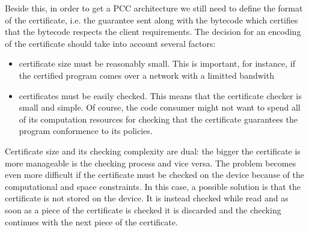 Beside this, in order to get a PCC architecture we still need to define the
format of the certificate, i.e. 
the guarantee sent along with the bytecode which certifies that the bytecode 
respects the client requirements. The decision for an encoding of the
certificate should take into account 
several factors:
\begin{itemize} 
  \item certificate size must be reasonably small. This is important, for
    instance,  if the certified program comes over a network 
    with a limitted bandwith
  \item certificates must be easily checked. This means that the certificate checker is  small and simple.
               Of course, the code consumer might not want to spend all of its computation 
              resources for checking that the certificate guarantees the
               program conformence to its policies.   
\end{itemize}

Certificate size and its checking complexity are dual: the
bigger the certificate is more manageable is the checking 
process and vice versa.  The problem becomes even more difficult if the
certificate must be checked on the device because 
of the computational and space constraints. In this case, a possible solution
is that the certificate is not stored on the device. It is instead checked
while read and as soon as a piece  of the certificate is checked it is
discarded and the checking continues with the next piece of the certificate.
  
%  
% 
%        
%     


